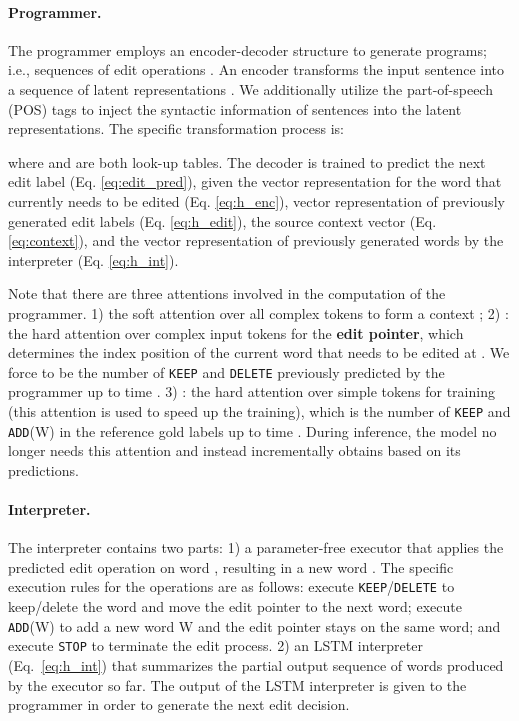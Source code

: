 \documentclass[11pt,a4paper]{article}
\def\add{{\texttt{ADD}}}
\def\deletes{{\texttt{DELETE} }}
\def\keep{{\texttt{KEEP}}}
\def\keeps{{\texttt{KEEP} }}
\begin{document}
\paragraph{Programmer.} The programmer employs an encoder-decoder structure to generate programs; i.e., sequences of edit operations . An encoder transforms the input sentence  into a sequence of latent representations . We additionally utilize the part-of-speech (POS) tags  to inject the syntactic information of sentences into the latent representations. The specific transformation process is:  

where  and  are both look-up tables.
The  decoder  is  trained  to  predict  the  next  edit label  (Eq. \ref{eq:edit_pred}), given the vector representation   for the word  that currently needs to be edited (Eq. \ref{eq:h_enc}), vector representation   of previously generated edit labels  (Eq. \ref{eq:h_edit}), the  source context  vector   (Eq.\ref{eq:context}), and the vector representation of previously generated words by the interpreter  (Eq. \ref{eq:h_int}). 


Note that there are three attentions involved in the computation of the programmer. 1) the soft attention over all complex tokens to form a context ; 2) :  the hard attention over complex input tokens for the \textbf{edit pointer}, which determines the index position of the current word that needs to be edited at . We force  to be  the number of \keeps and \deletes previously predicted by the programmer up to time . 3) : the hard attention over simple tokens for training (this attention is used to speed up the training), which is the number of \keeps and \add(W) in the reference gold labels up to time . During inference, the model no longer needs this attention and instead incrementally obtains  based on its predictions. 

\paragraph{Interpreter.} The interpreter contains two parts: 1) a parameter-free executor  that applies the predicted edit operation  on word , resulting in a new word . The specific execution rules for the operations are as follows: execute \keep/\deletes to keep/delete the word and move the edit pointer to the next word; execute \add(W) to add a new word W and the edit pointer stays on the same word; and execute \texttt{STOP} to terminate the edit process. 2) an LSTM interpreter (Eq.~\ref{eq:h_int}) that summarizes the partial output sequence of words produced by the executor so far. The output of the LSTM interpreter is given to the programmer in order to generate the next edit decision. 
\end{document}
